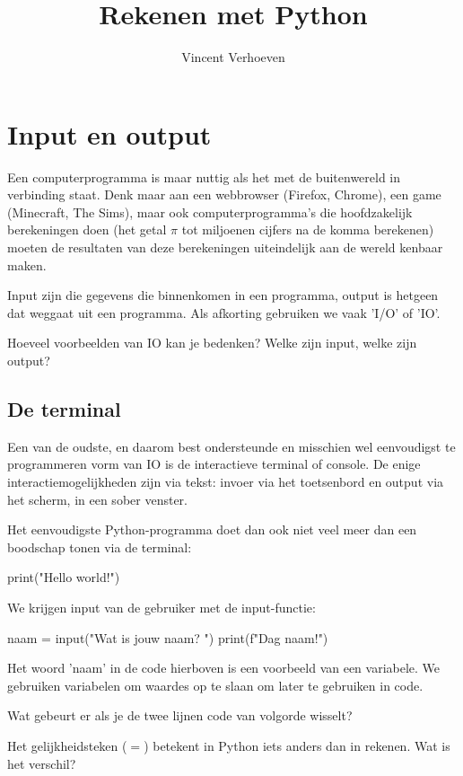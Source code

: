 \documentclass[10pt,a4paper]{article}
\author{Vincent Verhoeven}
\title{Rekenen met Python}
\newenvironment{task}{\smallpencil}{}
\begin{document}
\section{Input en output}
Een computerprogramma is maar nuttig als het met de buitenwereld in verbinding staat. Denk maar aan een webbrowser (Firefox, Chrome), een game (Minecraft, The Sims), maar ook computerprogramma's die hoofdzakelijk berekeningen doen (het getal $\pi$ tot miljoenen cijfers na de komma berekenen) moeten de resultaten van deze berekeningen uiteindelijk aan de wereld kenbaar maken.

Input zijn die gegevens die binnenkomen in een programma, output is hetgeen dat weggaat uit een programma. Als afkorting gebruiken we vaak 'I/O' of 'IO'.

\begin{task}
Hoeveel voorbeelden van IO kan je bedenken? Welke zijn input, welke zijn output?
\end{task}

\subsection{De terminal}

Een van de oudste, en daarom best ondersteunde en misschien wel eenvoudigst te programmeren vorm van IO is de interactieve terminal of console. De enige interactiemogelijkheden zijn via tekst: invoer via het toetsenbord en output via het scherm, in een sober venster.

Het eenvoudigste Python-programma doet dan ook niet veel meer dan een boodschap tonen via de terminal:
\begin{python}
print("Hello world!")
\end{python}
We krijgen input van de gebruiker met de input-functie:
\begin{python}
naam = input("Wat is jouw naam? ")
print(f"Dag {naam}!")
\end{python}

Het woord 'naam' in de code hierboven is een voorbeeld van een variabele. We gebruiken variabelen om waardes op te slaan om later te gebruiken in code.

\begin{task}
Wat gebeurt er als je de twee lijnen code van volgorde wisselt?
\end{task}

\begin{task}
Het gelijkheidsteken ($=$) betekent in Python iets anders dan in rekenen. Wat is het verschil?
\end{task}
\end{document}
